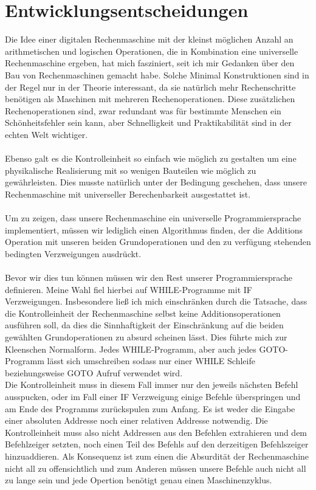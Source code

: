 \documentclass[11pt,a4paper,leqno]{report}
\numberwithin{equation}{chapter}
\begin{document}
\section{Entwicklungsentscheidungen}
Die Idee einer digitalen Rechenmaschine mit der kleinst m\"oglichen Anzahl an arithmetischen und logischen Operationen, die in Kombination eine universelle Rechenmaschine ergeben, hat mich fasziniert, seit ich mir Gedanken \"uber den Bau von Rechenmaschinen gemacht habe. Solche Minimal Konstruktionen sind in der Regel nur
in der Theorie interessant, da sie nat\"urlich mehr Rechenschritte ben\"otigen als Maschinen mit mehreren Rechenoperationen. Diese zus\"atzlichen Rechenoperationen sind, zwar redundant was f\"ur bestimmte Menschen ein Sch\"onheitsfehler sein kann, aber Schnelligkeit und Praktikabilit\"at sind in der echten Welt wichtiger.\\
\\
Ebenso galt es die Kontrolleinheit so einfach wie m\"oglich zu gestalten um eine physikalische Realisierung mit so wenigen Bauteilen wie m\"oglich zu gew\"ahrleisten. Dies musste nat\"urlich unter der Bedingung geschehen, dass unsere Rechenmaschine mit universeller Berechenbarkeit ausgestattet ist.
\\
\\
Um zu zeigen, dass unsere Rechenmaschine ein universelle Programmiersprache implementiert, m\"ussen wir lediglich einen Algorithmus finden, der die Additions Operation mit unseren beiden Grundoperationen und den zu verf\"ugung stehenden bedingten Verzweigungen ausdr\"uckt.
\\
\\
Bevor wir dies tun k\"onnen m\"ussen wir den Rest unserer Programmiersprache definieren. Meine Wahl fiel hierbei auf WHILE-Programme mit IF Verzweigungen. Insbesondere lie\ss{} ich mich einschr\"anken durch die Tatsache, dass die Kontrolleinheit der Rechenmaschine selbst keine Additionsoperationen ausf\"uhren soll, da dies die Sinnhaftigkeit der Einschr\"ankung auf die beiden gew\"ahlten Grundoperationen zu absurd scheinen l\"asst. Dies f\"uhrte mich zur Kleenschen Normalform. Jedes WHILE-Programm, aber auch jedes GOTO- Programm l\"asst sich umschreiben sodass nur einer WHILE Schleife beziehungsweise GOTO Aufruf verwendet wird.\\
Die Kontrolleinheit muss in diesem Fall immer nur den jeweils n\"achsten Befehl ausspucken, oder im Fall einer IF Verzweigung einige Befehle \"uberspringen und am Ende des Programms zur\"uckspulen zum Anfang. Es ist weder die Eingabe einer absoluten Addresse noch einer relativen Addresse notwendig. Die Kontrolleinheit muss also nicht Addressen aus den Befehlen extrahieren und dem Befehlzeiger setzten, noch einen Teil des Befehls auf den derzeitigen Befehlszeiger hinzuaddieren. Als Konsequenz ist zum einen die Absurdit\"at der Rechenmaschine nicht all zu offensichtlich und zum Anderen m\"ussen unsere Befehle auch nicht all zu lange sein und jede Opertion ben\"otigt genau einen Maschinenzyklus.\\
\end{document}
